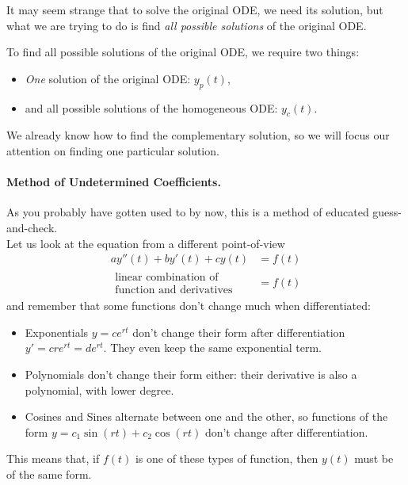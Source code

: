 \begin{important}
It may seem strange that to solve the original ODE, we need its solution, but what we are trying to do is find \emph{all possible solutions} of the original ODE.

To find all possible solutions of the original ODE, we require two things:
\begin{itemize}
	\item \emph{One} solution of the original ODE:  $y_p(t)$,
	\item and all possible solutions of the homogeneous ODE: $y_c(t)$.
\end{itemize}
\end{important}


We already know how to find the complementary solution, so we will focus our attention on finding one particular solution.

\paragraph{\color{cyan}Method of Undetermined Coefficients.} As you probably have gotten used to by now, this is a method of educated guess-and-check. \\

Let us look at the equation from a different point-of-view
\begin{align*}
a y''(t) + by'(t) + cy(t) & = f(t) \\
\substack{\displaystyle\text{linear combination of}\\\displaystyle\text{function and derivatives}} & = f(t)
\end{align*}
and remember that some functions don't change much when differentiated:
\begin{itemize}
	\item Exponentials $y=ce^{rt}$ don't change their form after differentiation $y'=cre^{rt} = de^{rt}$. They even keep the same exponential term.
	\item Polynomials don't change their form either: their derivative is also a polynomial, with lower degree.
	\item Cosines and Sines alternate between one and the other, so functions of the form $y=c_1 \sin(rt) + c_2\cos(rt)$ don't change after differentiation.
\end{itemize}


\begin{important}
This means that, if $f(t)$ is one of these types of function, then $y(t)$ must be of the same form.	
\end{important}

